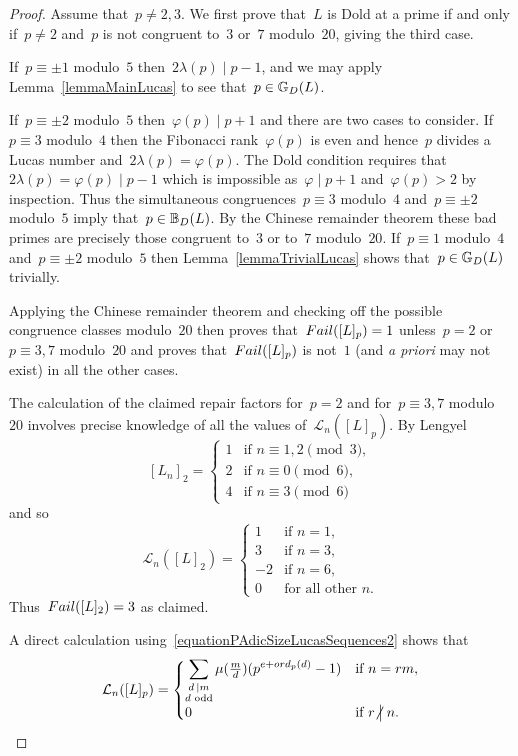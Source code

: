 \documentclass[10pt,a4paper]{amsart}
\numberwithin{equation}{section} %
\numberwithin{table}{section} %
\numberwithin{figure}{section}
\def\gooddoldprimes{\mathbb{G}_{\rm{D}}}
\def\baddoldprimes{\mathbb{B}_{\rm{D}}}
\newcommand\ord{{\rm{ord}}}
\newcommand\failure{{\rm{Fail}}}
\newcommand\least{{\mathcal{L}}}
\newcommand\notdivides{\mathrel{\kern-3pt\not\!\kern4.3pt\bigm|}}
\newcommand\divides\mid
\newcommand\smalldivides{\mathrel{\kern-2pt\kern3.5pt|}}
\begin{document}
\begin{proof}
Assume that~$p\neq2,3$.
We first prove that~$L$ is Dold at a prime
if and only if~$p\neq2$ and~$p$ is not congruent to~$3$
or~$7$ modulo~$20$, giving the third case.

If~$p\equiv\pm1$ modulo~$5$ then~$2\lambda(p)\divides p-1$,
and we may apply Lemma~\ref{lemmaMainLucas}
to see that~$p\in\gooddoldprimes(L)$.

If~$p\equiv\pm2$ modulo~$5$ then~$\varphi(p)\divides p+1$
and there are two cases to consider.
If~$p\equiv3$ modulo~$4$ then the Fibonacci rank~$\varphi(p)$
is even and hence~$p$ divides a Lucas number
and~$2\lambda(p)=\varphi(p)$.
The Dold condition requires that~$2\lambda(p)=\varphi(p)\divides p-1$
which is impossible as~$\varphi\divides p+1$ and~$\varphi(p)>2$
by inspection. Thus the simultaneous congruences~$p\equiv3$
modulo~$4$ and~$p\equiv\pm2$ modulo~$5$ imply that~$p\in\baddoldprimes(L)$.
By the Chinese remainder theorem these bad primes
are precisely those congruent to~$3$ or to~$7$ modulo~$20$.
If~$p\equiv1$ modulo~$4$ and~$p\equiv\pm2$ modulo~$5$
then Lemma~\ref{lemmaTrivialLucas} shows that~$p
\in\gooddoldprimes(L)$ trivially.

Applying the Chinese remainder theorem and checking
off the possible congruence classes modulo~$20$ then
proves that~$\failure([L]_p)=1$ unless~$p=2$ or~$p\equiv3,7$ modulo~$20$
and proves that~$\failure([L]_p)$ is not~$1$ (and
{\it{a priori}} may not exist) in all the other
cases.

The calculation of the claimed repair factors
for~$p=2$ and for~$p\equiv3,7$ modulo~$20$
involves precise knowledge of all the values
of~$\least_n([L]_p)$.
By Lengyel~\cite[Lemma~2]{MR1337793}
\[
[L_n]_2
=
\begin{cases}
1&\mbox{if }n\equiv1,2\pmod{3},\\
2&\mbox{if }n\equiv0\pmod{6},\\
4&\mbox{if }n\equiv3\pmod{6}
\end{cases}
\]
and so
\[
\least_n([L]_2)
=
\begin{cases}
1&\mbox{if }n=1,\\
3&\mbox{if }n=3,\\
-2&\mbox{if }n=6,\\
0&\mbox{for all other $n$}.
\end{cases}
\]
Thus~$\failure([L]_2)=3$ as claimed.

A direct calculation
using~\eqref{equationPAdicSizeLucasSequences2} shows
that
\begin{equation}\label{equationAA}
\least_{n}([L]_p)
=
\begin{cases}
\displaystyle\sum_{\substack{d\smalldivides m\\d\text{ odd}}}
\mu(\tfrac{m}{d})(p^{e+\ord_p(d)}-1)
&\mbox{if }n=rm,\\
0&\mbox{if }r\notdivides n.
\end{cases}
\end{equation}


\end{proof}
\end{document}
